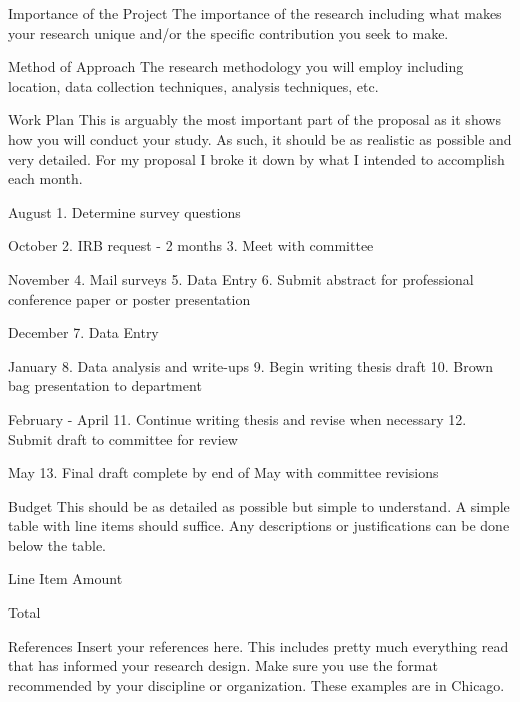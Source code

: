 \pagebreak 

Importance of the Project
The importance of the research including what makes your research unique and\slash or the specific contribution you seek to make.

\pagebreak 

Method of Approach
The research methodology you will employ including location, data collection techniques, analysis techniques, etc.

\pagebreak 

Work Plan
This is arguably the most important part of the proposal as it shows how you will conduct your study. As such, it should be as realistic as possible and very detailed. For my proposal I broke it down by what I intended to accomplish each month.

August
1. Determine survey questions

October
2. IRB request - 2 months
3. Meet with committee

November
4. Mail surveys
5. Data Entry
6. Submit abstract for professional conference paper or poster presentation

December
7. Data Entry

January
8. Data analysis and write-ups
9. Begin writing thesis draft
10. Brown bag presentation to department

February - April
11. Continue writing thesis and revise when necessary
12. Submit draft to committee for review 

May
13. Final draft complete by end of May with committee revisions

\pagebreak 

Budget
This should be as detailed as possible but simple to understand. A simple table with line items should suffice. Any descriptions or justifications can be done below the table.

Line Item
Amount

Total

\pagebreak 

References
Insert your references here. This includes pretty much everything read that has informed your research design. Make sure you use the format recommended by your discipline or organization. These examples are in Chicago.

